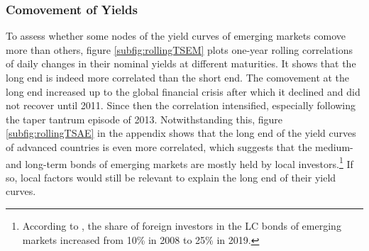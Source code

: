 {\subsubsection{Comovement of Yields}
To assess whether 
some nodes of the yield curves of emerging markets comove more than others,
figure \ref{subfig:rollingTSEM} plots one-year rolling correlations of daily changes in their nominal yields at different maturities.
It shows that the long end is indeed more correlated than the short end. 
The comovement at the long end increased up to the global financial crisis after which it declined and did not recover until 2011. 
Since then the correlation intensified, especially following the taper tantrum episode of 2013.
Notwithstanding this, figure \ref{subfig:rollingTSAE} in the appendix shows that the long end of the yield curves of advanced countries is even more correlated, which suggests that the medium- and long-term bonds of emerging markets are mostly held by local investors.\footnote{ According to \cite{KolasaWesolowski:2020}, the share of foreign investors in the LC bonds of emerging markets increased from 10\% in 2008 to 25\% in 2019.}
If so, local factors would still be relevant to explain the long end of their yield curves. 

}
